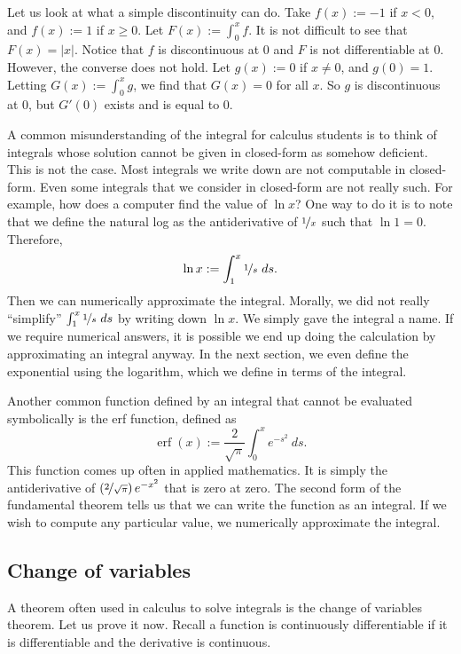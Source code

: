 \documentclass[12pt]{book}
\newcommand{\abs}[1]{\left\lvert {#1} \right\rvert}
\theoremstyle{plain}
\theoremstyle{remark}
\theoremstyle{definition}
\theoremstyle{exercise}
\theoremstyle{example}
\begin{document}
Let us look at what a simple discontinuity can do.  Take $f(x) := -1$ if $x
< 0$, and $f(x) := 1$ if $x \geq 0$.  Let $F(x) := \int_0^x f$.  It is not
difficult to see that $F(x) = \abs{x}$.  Notice that $f$ is discontinuous at
$0$ and $F$ is not differentiable at $0$.  However, the converse does not
hold.
Let $g(x) := 0$ if $x \not= 0$, and $g(0) = 1$.  Letting $G(x) :=
\int_0^x g$, we find that $G(x) = 0$ for all $x$.  So $g$ is discontinuous
at $0$, but $G'(0)$ exists and is equal to 0.

A common misunderstanding of the integral for calculus students is to
think of integrals whose solution cannot be given in closed-form as somehow
deficient.  This is not the case.  Most integrals we write down are not
computable in closed-form.  Even some integrals that we consider
in closed-form are not really such.  For example, how does a computer find
the value of $\ln x$?  One way to do it is to note that
we define the natural log as the antiderivative of $\nicefrac{1}{x}$
such that $\ln 1 = 0$.
Therefore,
\begin{equation*}
\ln x := \int_1^x \nicefrac{1}{s}~ds .
\end{equation*}
Then we can numerically approximate the integral.  Morally,
we did not really ``simplify'' $\int_1^x \nicefrac{1}{s}~ds$ by
writing down $\ln x$.  We simply gave the integral a name.
If we require numerical answers,
it is possible we end up doing
the calculation by approximating an integral anyway.
In the next section, we even define the exponential using
the logarithm, which we define in terms of the integral.

Another common function defined by an integral that cannot
be evaluated symbolically
is the erf function, defined as
\begin{equation*}
\operatorname{erf}(x) := \frac{2}{\sqrt{\pi}} \int_0^x e^{-s^2} ~ds .
\end{equation*}
This function comes up often in applied mathematics.  It is simply 
the antiderivative of $\left(\nicefrac{2}{\sqrt{\pi}}\right) e^{-x^2}$
that is zero at zero.
The second form of the fundamental theorem tells us that we can write the function
as an integral.  If we wish to compute any particular value, we 
numerically approximate the integral.

\subsection{Change of variables}

A theorem often used in calculus to solve integrals is the change of
variables theorem.  Let us prove it now.  Recall 
a function is continuously differentiable if
it is differentiable and the derivative is continuous.
\end{document}
